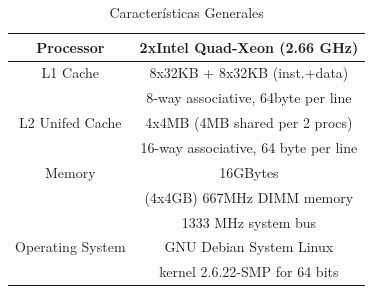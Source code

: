 \documentclass[letterpaper, 12pt]{article}
\begin{document}
   \begin{table}
\begin{center} 
   \caption{\label{tabla_hardware} Características Generales}
   \begin{tabular}{|c|c|}
\hline
   Processor& 2xIntel Quad-Xeon (2.66 GHz)\\
   \hline
   L1 Cache&8x32KB + 8x32KB (inst.+data)\\
   &8-way associative, 64byte per line\\
   \hline
   L2 Unifed Cache&4x4MB (4MB shared per 2 procs)\\
   &16-way associative, 64 byte per line\\
   \hline
   Memory&16GBytes\\
   & (4x4GB) 667MHz DIMM memory\\
   & 1333 MHz system bus\\
   \hline
   Operating System&GNU Debian System Linux\\
   &kernel 2.6.22-SMP for 64 bits\\
   \hline
   \end{tabular}
\end{center}
   \end{table}



\tableofcontents{}

\listoffigures

\listoftables


\mainmatter











%
%




\backmatter



\end{document}
